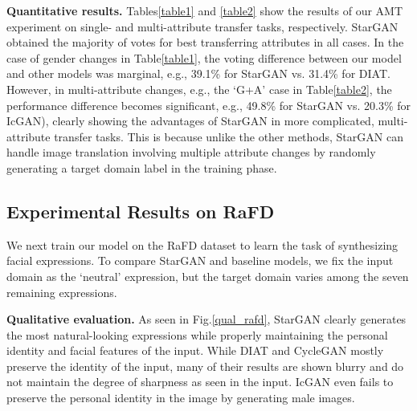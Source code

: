 \documentclass[10pt,twocolumn,letterpaper]{article}
\begin{document}
\noindent\textbf{Quantitative results.} Tables\thinspace\ref{table1} and \ref{table2} show the results of our AMT experiment on single- and multi-attribute transfer tasks, respectively. StarGAN obtained the majority of votes for best transferring attributes in all cases. 
In the case of gender changes in Table\thinspace\ref{table1}, the voting difference between our model and other models was marginal, e.g., 39.1\% for StarGAN vs. 31.4\% for DIAT. However, in multi-attribute changes, e.g., the `G+A' case in Table\thinspace\ref{table2}, the performance difference becomes significant, e.g., 49.8\% for StarGAN vs. 20.3\% for IcGAN), clearly showing the advantages of StarGAN in more complicated, multi-attribute transfer tasks. This is because unlike the other methods, StarGAN can handle image translation involving multiple attribute changes by randomly generating a target domain label in the training phase. 

\subsection{Experimental Results on RaFD}
We next train our model on the RaFD dataset to learn the task of synthesizing facial expressions. To compare StarGAN and baseline models, we fix the input domain as the `neutral' expression, but the target domain varies among the seven remaining expressions.

\medskip

\noindent\textbf{Qualitative evaluation.} As seen in Fig.\thinspace\ref{qual_rafd}, StarGAN clearly generates the most natural-looking expressions while properly maintaining the personal identity and facial features of the input. While DIAT and CycleGAN mostly preserve the identity of the input, many of their results are shown blurry and do not maintain the degree of sharpness as seen in the input. IcGAN even fails to preserve the personal identity in the image by generating male images. 
\end{document}
